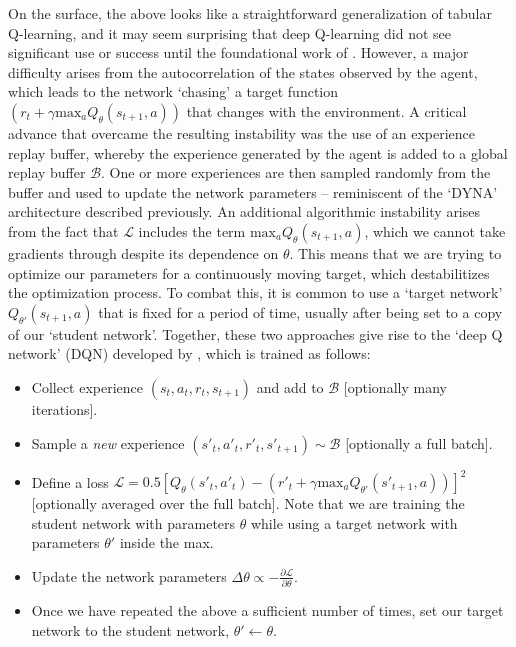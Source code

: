 On the surface, the above looks like a straightforward generalization of tabular Q-learning, and it may seem surprising that deep Q-learning did not see significant use or success until the foundational work of \citet{mnih2013playing}.
However, a major difficulty arises from the autocorrelation of the states observed by the agent, which leads to the network `chasing' a target function $(r_t + \gamma \text{max}_a Q_\theta(s_{t+1}, a))$ that changes with the environment.
A critical advance that overcame the resulting instability was the use of an experience replay buffer, whereby the experience generated by the agent is added to a global replay buffer $\mathcal{B}$.
One or more experiences are then sampled randomly from the buffer and used to update the network parameters -- reminiscent of the `DYNA' architecture described previously.
An additional algorithmic instability arises from the fact that $\mathcal{L}$ includes the term $\text{max}_a Q_\theta(s_{t+1}, a)$, which we cannot take gradients through despite its dependence on $\theta$.
This means that we are trying to optimize our parameters for a continuously moving target, which destabilitizes the optimization process.
To combat this, it is common to use a `target network' $Q_{\theta'}(s_{t+1}, a)$ that is fixed for a period of time, usually after being set to a copy of our `student network'.
Together, these two approaches give rise to the `deep Q network' (DQN) developed by \citet{mnih2013playing}, which is trained as follows:
\begin{itemize}
    \item Collect experience $(s_t, a_t, r_t, s_{t+1})$ and add to $\mathcal{B}$ [optionally many iterations].
    \item Sample a \emph{new} experience $(s'_t, a'_t, r'_t, s'_{t+1}) \sim \mathcal{B}$ [optionally a full batch].
    \item Define a loss $\mathcal{L} = 0.5 [ Q_\theta(s'_t, a'_t) - (r'_t + \gamma \text{max}_a Q_{\theta'}(s'_{t+1}, a)) ]^2 $ [optionally averaged over the full batch]. Note that we are training the student network with parameters $\theta$ while using a target network with parameters $\theta'$ inside the max.
    \item Update the network parameters $\Delta \theta \propto - \frac{\partial \mathcal{L}}{\partial \theta}$.
    \item Once we have repeated the above a sufficient number of times, set our target network to the student network, $\theta' \leftarrow \theta$.
\end{itemize}
